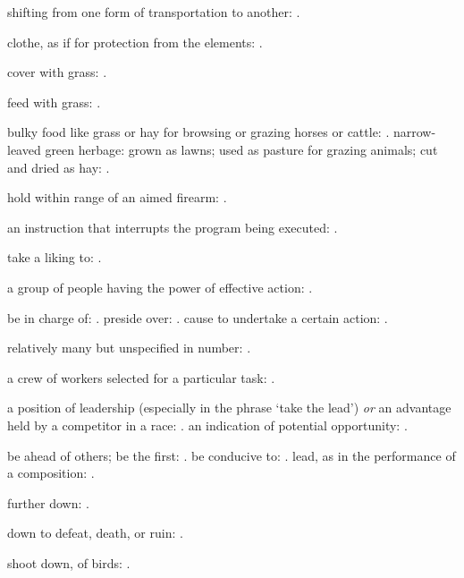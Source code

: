   shifting from one form of transportation to another:   .

  clothe, as if for protection from the elements:   .

  cover with grass:   .

  feed with grass: .

  bulky food like grass or hay for browsing or grazing horses or cattle:   . narrow-leaved green herbage: grown as lawns; used as pasture for grazing animals; cut and dried as hay: .

  hold within range of an aimed firearm: .

  an instruction that interrupts the program being executed: .

  take a liking to: .

  a group of people having the power of effective action: .

  be in charge of:   . preside over:   . cause to undertake a certain action: .

  relatively many but unspecified in number: .

  a crew of workers selected for a particular task: .

  a position of leadership (especially in the phrase `take the lead') \textit{or} an advantage held by a competitor in a race: . an indication of potential opportunity:   .

  be ahead of others; be the first:   . be conducive to:   . lead, as in the performance of a composition:   .

  further down:   .

  down to defeat, death, or ruin: .

  shoot down, of birds: .


